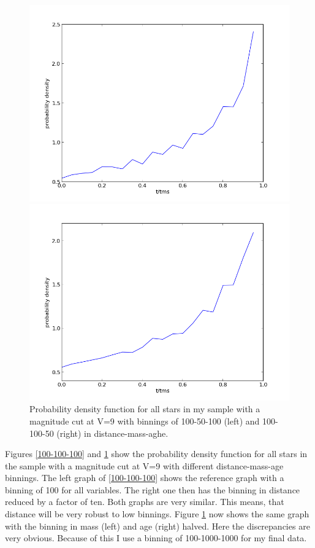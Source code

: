\documentclass[a4paper,10pt]{article}
\begin{document}
 \begin{figure}[h!]
  \begin{minipage}{0.49\textwidth}
   \includegraphics[width=\textwidth]{100-50-100}
  \end{minipage}
  \begin{minipage}{0.49\textwidth}
   \includegraphics[width=\textwidth]{100-100-50}
  \end{minipage}
   \caption{Probability density function for all stars in my sample with a magnitude cut at V=9 with binnings of
 100-50-100 (left) and 100-100-50 (right) in distance-mass-aghe.\label{100-50-100}}
 \end{figure}
 
  Figures \ref{100-100-100} and \ref{100-50-100} show the probability density function for all stars in the sample
  with a magnitude cut at V=9 with different distance-mass-age binnings. The left graph of \ref{100-100-100} shows the reference graph
  with a binning of 100 for all variables. The right one then has the binning in distance reduced by a factor of ten. Both graphs
  are very similar. This means, that distance will be very robust to low binnings. Figure \ref{100-50-100} 
  now shows the same graph with the binning in mass (left) and age (right) halved. Here the discrepancies are very obvious. 
  Because of this I use a binning of 100-1000-1000 for my final data.
 
\end{document}
